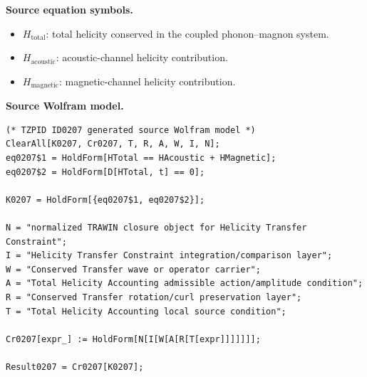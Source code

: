 \begin{minipage}[t]{0.49\linewidth}
\begingroup
\small
\raggedright
\textbf{Source equation symbols.}\par
\begin{itemize}[leftmargin=1.35em,itemsep=1pt,topsep=1pt,parsep=0pt]
    \item $H_{\mathrm{total}}$: total helicity conserved in the coupled phonon--magnon system.
    \item $H_{\mathrm{acoustic}}$: acoustic-channel helicity contribution.
    \item $H_{\mathrm{magnetic}}$: magnetic-channel helicity contribution.
\end{itemize}
\endgroup
\end{minipage}\hfill
\begin{minipage}[t]{0.47\linewidth}
\begingroup
\scriptsize
\raggedright
\textbf{Source Wolfram model.}\par
\begin{Verbatim}[fontsize=\tiny,breaklines=true,breakanywhere=true]
(* TZPID ID0207 generated source Wolfram model *)
ClearAll[K0207, Cr0207, T, R, A, W, I, N];
eq0207$1 = HoldForm[HTotal == HAcoustic + HMagnetic];
eq0207$2 = HoldForm[D[HTotal, t] == 0];

K0207 = HoldForm[{eq0207$1, eq0207$2}];

N = "normalized TRAWIN closure object for Helicity Transfer Constraint";
I = "Helicity Transfer Constraint integration/comparison layer";
W = "Conserved Transfer wave or operator carrier";
A = "Total Helicity Accounting admissible action/amplitude condition";
R = "Conserved Transfer rotation/curl preservation layer";
T = "Total Helicity Accounting local source condition";

Cr0207[expr_] := HoldForm[N[I[W[A[R[T[expr]]]]]]];

Result0207 = Cr0207[K0207];
\end{Verbatim}
\endgroup
\end{minipage}

